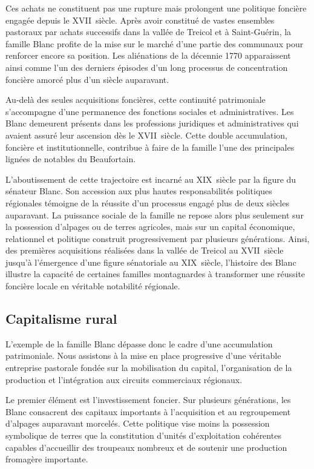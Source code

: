 \documentclass[12pt,a4paper]{report}
\begin{document}
	Ces achats ne constituent pas une rupture mais prolongent une politique foncière engagée depuis le XVII\ieme\ siècle. Après avoir constitué de vastes ensembles pastoraux par achats successifs dans la vallée de Treicol et à Saint-Guérin, la famille Blanc profite de la mise sur le marché d'une partie des communaux pour renforcer encore sa position. Les aliénations de la décennie 1770 apparaissent ainsi comme l'un des derniers épisodes d'un long processus de concentration foncière amorcé plus d'un siècle auparavant.
	
	Au-delà des seules acquisitions foncières, cette continuité patrimoniale s'accompagne d'une permanence des fonctions sociales et administratives. Les Blanc demeurent présents dans les professions juridiques et administratives qui avaient assuré leur ascension dès le XVII\ieme\ siècle. Cette double accumulation, foncière et institutionnelle, contribue à faire de la famille l'une des principales lignées de notables du Beaufortain.
	
	L'aboutissement de cette trajectoire est incarné au XIX\ieme\ siècle par la figure du sénateur Blanc. Son accession aux plus hautes responsabilités politiques régionales témoigne de la réussite d'un processus engagé plus de deux siècles auparavant. La puissance sociale de la famille ne repose alors plus seulement sur la possession d'alpages ou de terres agricoles, mais sur un capital économique, relationnel et politique construit progressivement par plusieurs générations. Ainsi, des premières acquisitions réalisées dans la vallée de Treicol au XVII\ieme\ siècle jusqu'à l'émergence d'une figure sénatoriale au XIX\ieme\ siècle, l'histoire des Blanc illustre la capacité de certaines familles montagnardes à transformer une réussite foncière locale en véritable notabilité régionale.
	
	\subsection{Capitalisme rural}
	
	L'exemple de la famille Blanc dépasse donc le cadre d'une  accumulation patrimoniale. Nous assistons à la mise en place progressive d'une véritable entreprise pastorale fondée sur la mobilisation du capital, l'organisation de la production et l'intégration aux circuits commerciaux régionaux.
	
	Le premier élément est l'investissement foncier. Sur plusieurs générations, les Blanc consacrent des capitaux importants à l'acquisition et au regroupement d'alpages auparavant morcelés. Cette politique vise moins la possession symbolique de terres que la constitution d'unités d'exploitation cohérentes capables d'accueillir des troupeaux nombreux et de soutenir une production fromagère importante.
	
\end{document}
